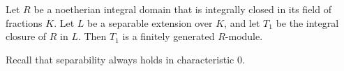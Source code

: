 Let $R$ be a noetherian integral domain that is integrally closed in its
field of fractions $K$. Let $L$ be a separable extension over $K$, and let $T_1$
be
the integral closure of $R$ in $L$. Then $T_1$ is a finitely generated $R$-module.

Recall that separability always holds in characteristic $0$.
